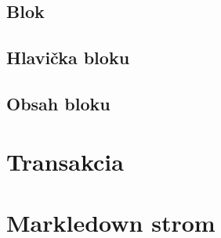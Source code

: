 \subsection{Blok}

\subsection{Hlavička bloku}

\subsection{Obsah bloku}


\section{Transakcia}
\section{Markledown strom}



